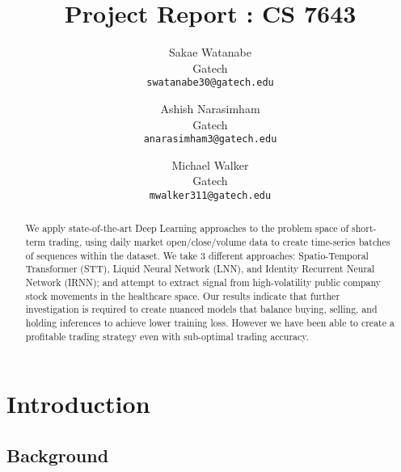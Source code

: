 \documentclass[10pt,twocolumn,letterpaper]{article}
\begin{document}
\title{Project Report : CS 7643}

\author{Sakae Watanabe\\
Gatech\\
{\tt\small swatanabe30@gatech.edu}
\and
Ashish Narasimham\\
Gatech\\
{\tt\small anarasimham3@gatech.edu}
\and
Michael Walker\\
Gatech\\
{\tt\small mwalker311@gatech.edu}
}

\maketitle

\begin{abstract}
    We apply state-of-the-art Deep Learning approaches to the problem space of short-term trading, using daily market open/close/volume data to create time-series batches of sequences within the dataset. We take 3 different approaches: Spatio-Temporal Transformer (STT), Liquid Neural Network (LNN), and Identity Recurrent Neural Network (IRNN); and attempt to extract signal from high-volatility public company stock movements in the healthcare space. Our results indicate that further investigation is required to create nuanced models that balance buying, selling, and holding inferences to achieve lower training loss. However we have been able to create a profitable trading strategy even with sub-optimal trading accuracy.

\end{abstract}

\section{Introduction}

\subsection{Background} 
\end{document}
